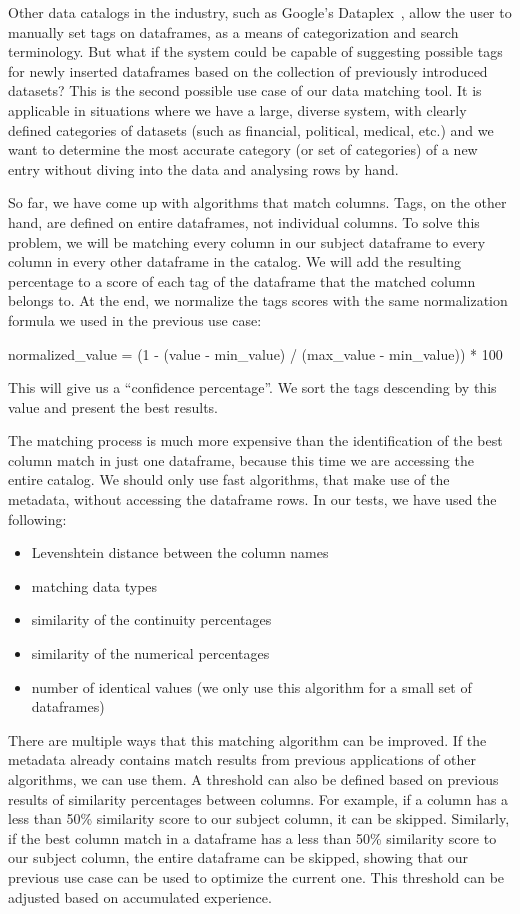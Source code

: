 Other data catalogs in the industry, such as Google's Dataplex~\cite{GoogleDataplex}, allow the user to manually set tags
on dataframes, as a means of categorization and search terminology.
But what if the system could be capable of suggesting possible tags for newly inserted dataframes based on the collection
of previously introduced datasets?
This is the second possible use case of our data matching tool.
It is applicable in situations where we have a large, diverse system, with clearly defined categories of datasets (such as
financial, political, medical, etc.) and we want to determine the most accurate category (or set of categories) of a new entry
without diving into the data and analysing rows by hand.

So far, we have come up with algorithms that match columns.
Tags, on the other hand, are defined on entire dataframes, not individual columns.
To solve this problem, we will be matching every column in our subject dataframe to every column in every other dataframe
in the catalog.
We will add the resulting percentage to a score of each tag of the dataframe that the matched column belongs to.
At the end, we normalize the tags scores with the same normalization formula we used in the previous use case:

normalized\_value = (1 - (value - min\_value) / (max\_value - min\_value)) * 100

This will give us a ``confidence percentage''.
We sort the tags descending by this value and present the best results.

The matching process is much more expensive than the identification of the best column match in just one dataframe, because
this time we are accessing the entire catalog.
We should only use fast algorithms, that make use of the metadata, without accessing the dataframe rows.
In our tests, we have used the following:

\begin{itemize}
    \item Levenshtein distance between the column names
    \item matching data types
    \item similarity of the continuity percentages
    \item similarity of the numerical percentages
    \item number of identical values (we only use this algorithm for a small set of dataframes)
\end{itemize}

There are multiple ways that this matching algorithm can be improved.
If the metadata already contains match results from previous applications of other algorithms, we can use them.
A threshold can also be defined based on previous results of similarity percentages between columns.
For example, if a column has a less than 50\% similarity score to our subject column, it can be skipped.
Similarly, if the best column match in a dataframe has a less than 50\% similarity score to our subject column, the entire
dataframe can be skipped, showing that our previous use case can be used to optimize the current one.
This threshold can be adjusted based on accumulated experience.

